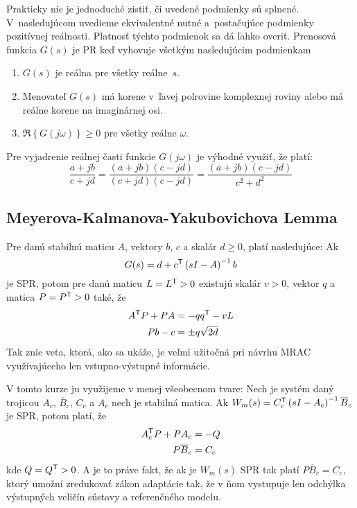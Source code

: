 \documentclass[a4paper, 10pt, ]{article}
\begin{document}
Prakticky nie je jednoduché zistiť, či uvedené podmienky sú splnené. V~nasledujúcom uvedieme ekvivalentné nutné a~postačujúce podmienky pozitívnej reálnosti. Platnosť týchto podmienok sa dá ľahko overiť.
Prenosová funkcia $G(s)$ je PR keď vyhovuje všetkým nasledujúcim podmienkam
\begin{enumerate}
	\item $G(s)$ je reálna pre všetky reálne~$s$.
	\item Menovateľ $G(s)$ má korene  v~ľavej polrovine komplexnej roviny alebo má reálne korene na imaginárnej osi.
	\item $\Re \left\{ G(j\omega) \right\} \geq 0$ pre všetky reálne $\omega$.
\end{enumerate}

\noindent
Pre vyjadrenie reálnej časti funkcie $G(j\omega)$ je výhodné využiť, že platí:
\begin{equation*}
	\frac{a + jb}{c + jd} = \frac{(a + jb) (c - jd)}{(c + jd) (c - jd)} = \frac{(a + jb) (c - jd)}{c^2 + d^2}
\end{equation*}








\subsection{Meyerova-Kalmanova-Yakubovichova Lemma}
\label{Meyer-Kalman-Yakubovichova Lemma}


Pre danú stabilnú maticu $A$, vektory $b$, $c$ a skalár $d \geq 0$, platí nasledujúce: Ak
\begin{equation*}
	G(s) = d + c^{\mathsf{T}} \left( s I - A \right)^{-1} b
\end{equation*}
je SPR, potom pre danú maticu $L = L^{\mathsf{T}} > 0$ existujú skalár $v > 0$, vektor $q$ a matica $P =P^{\mathsf{T}} > 0$ také, že
\begin{align*}
	A^{\mathsf{T}} P + P A &= - q q^{\mathsf{T}} - v L \\
	P b	- c	&= \pm q \sqrt{2d}
\end{align*}
Tak znie veta, ktorá, ako sa ukáže, je veľmi užitočná pri návrhu MRAC využívajúceho len vstupno-výstupné informácie.

V tomto kurze ju využijeme v menej všeobecnom tvare: Nech je systém daný trojicou $A_c$, $\overline{B}_c$, $C_c$ a $A_c$ nech je stabilná matica. Ak $ W_m(s) = C_c^{\mathsf{T}} \left(  s I - A_c \right)^{-1} \overline{B}_c $ je SPR, potom platí, že
\begin{align*}
	  A_c^{\mathsf{T}} P + P A_c &= - Q\\
	  P \overline{B}_c &= C_c
\end{align*}
kde $Q = Q^{\mathsf{T}} > 0$. A je to práve fakt, že ak je $W_m(s)$ SPR tak platí $P \overline{B}_c = C_c$, ktorý umožní zredukovať zákon adaptácie tak, že v ňom vystupuje len odchýlka výstupných veličín sústavy a referenčného modelu.
\end{document}
